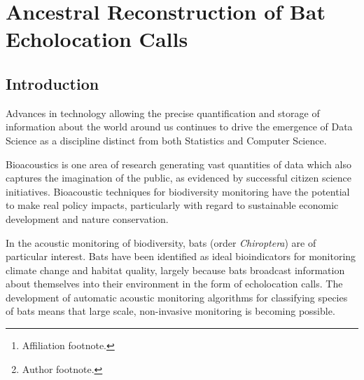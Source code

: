 \documentclass[wsdraft]{ws-rv9x6} %
\begin{document}
\chapter[Ancestral Reconstruction of Bat Echolocation Calls]{Ancestral Reconstruction of Bat Echolocation Calls}\label{ra_ch1}

\author[J.P. Meagher et al.]{J.P. Meagher\footnote{Author footnote.}}

\address{Department of Statistics,\\
University of Warwick, \\
J.Meagher@Warwick.ac.uk\footnote{Affiliation footnote.}}

\begin{abstract}
 
\end{abstract}
\body

\section{Introduction}

Advances in technology allowing the precise quantification and storage of information about the world around us continues to drive the emergence of Data Science as a discipline distinct from both Statistics and Computer Science.

Bioacoustics is one area of research generating vast quantities of data which also captures the imagination of the public, as evidenced by successful citizen science initiatives. \cite{allen2006citizen} \cite{pettorelli2013indicator} Bioacoustic techniques for biodiversity monitoring \cite{stathopoulos2017bat} \cite{damoulas2010bayesian} have the potential to make real policy impacts, particularly with regard to sustainable economic development and nature conservation.

In the acoustic monitoring of biodiversity, bats (order \textit{Chiroptera}) are of particular interest. Bats have been identified as ideal bioindicators for monitoring climate change and habitat quality,\cite{jones2009carpe} largely because bats broadcast information about themselves into their environment in the form of echolocation calls.\cite{jones2005echolocation} The development of automatic acoustic monitoring algorithms for classifying species of bats \cite{stathopoulos2017bat} \cite{walters2012continental} means that large scale, non-invasive monitoring is becoming possible. 
\end{document}
